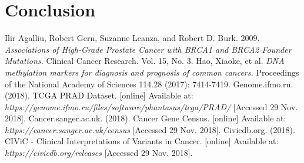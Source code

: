 \documentclass[a4paper,oneside]{article}
\begin{document}
\section{Conclusion}

\begin{thebibliography}{1}
 Ilir Agalliu, Robert Gern, Suzanne Leanza, and Robert D. Burk. 2009. {\em Associations of High-Grade Prostate Cancer with BRCA1 and BRCA2 Founder Mutations.} Clinical Cancer Research. Vol. 15, No. 3.
 Hao, Xiaoke, et al. {\em DNA methylation markers for diagnosis and prognosis of common cancers.} Proceedings of the National Academy of Sciences 114.28 (2017): 7414-7419.
 Genome.ifmo.ru. (2018). TCGA PRAD Dataset. [online] Available at: {\em https://genome.ifmo.ru/files/software/phantasus/tcga/PRAD/ } [Accessed 29 Nov. 2018].
 Cancer.sanger.ac.uk. (2018). Cancer Gene Census. [online] Available at: {\em https://cancer.sanger.ac.uk/census } [Accessed 29 Nov. 2018].
 Civicdb.org. (2018). CIViC - Clinical Interpretations of Variants in Cancer. [online] Available at: {\em https://civicdb.org/releases } [Accessed 29 Nov. 2018].
\end{thebibliography}
\end{document}
